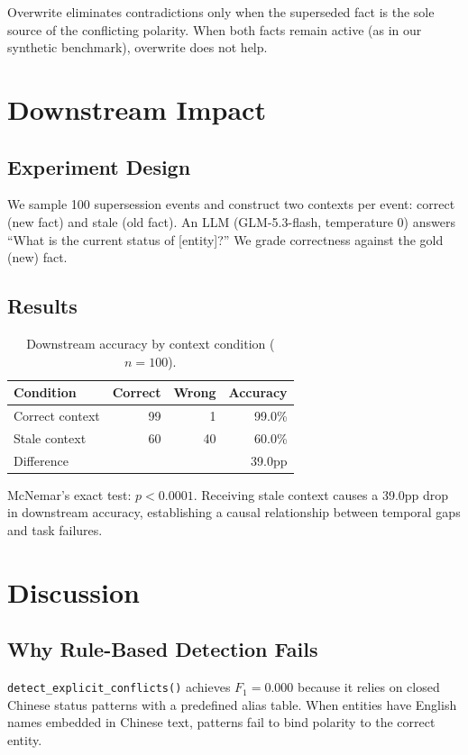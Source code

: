 \documentclass{article}
\begin{document}
Overwrite eliminates contradictions only when the superseded fact is the sole source of the conflicting polarity. When both facts remain active (as in our synthetic benchmark), overwrite does not help.

\section{Downstream Impact}
\label{sec:downstream}

\subsection{Experiment Design}
We sample 100 supersession events and construct two contexts per event: correct (new fact) and stale (old fact). An LLM (GLM-5.3-flash, temperature 0) answers ``What is the current status of [entity]?'' We grade correctness against the gold (new) fact.

\subsection{Results}

\begin{table}[h]
\centering
\caption{Downstream accuracy by context condition ($n{=}100$).}
\begin{tabular}{lrrr}
\toprule
Condition & Correct & Wrong & Accuracy \\
\midrule
Correct context & 99 & 1 & 99.0\% \\
Stale context & 60 & 40 & 60.0\% \\
\midrule
Difference & & & 39.0pp \\
\bottomrule
\end{tabular}
\label{tab:downstream}
\end{table}

McNemar's exact test: $p < 0.0001$. Receiving stale context causes a 39.0pp drop in downstream accuracy, establishing a causal relationship between temporal gaps and task failures.

\section{Discussion}
\subsection{Why Rule-Based Detection Fails}
\texttt{detect\_explicit\_conflicts()} achieves $F_1 = 0.000$ because it relies on closed Chinese status patterns with a predefined alias table. When entities have English names embedded in Chinese text, patterns fail to bind polarity to the correct entity.
\end{document}
